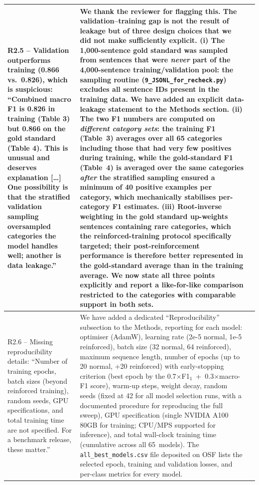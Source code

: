 \documentclass[11pt]{article}
\begin{document}
\begin{landscape}
\begin{longtable}{|L{4cm}|L{12cm}|L{9cm}|}
R2.5 -- Validation outperforms training (0.866 vs.\ 0.826), which is suspicious: \enquote{Combined macro F1 is 0.826 in training (Table 3) but 0.866 on the gold standard (Table 4). This is unusual and deserves explanation [\dots] One possibility is that the stratified validation sampling oversampled categories the model handles well; another is data leakage.} &
We thank the reviewer for flagging this. The validation--training gap is not the result of leakage but of three design choices that we did not make sufficiently explicit. (i) The 1{,}000-sentence gold standard was sampled from sentences that were \emph{never} part of the 4{,}000-sentence training/validation pool: the sampling routine (\texttt{9\_JSONL\_for\_recheck.py}) excludes all sentence IDs present in the training data. We have added an explicit data-leakage statement to the Methods section. (ii) The two F1 numbers are computed on \emph{different category sets}: the training F1 (Table~3) averages over all 65 categories including those that had very few positives during training, while the gold-standard F1 (Table~4) is averaged over the same categories \emph{after} the stratified sampling ensured a minimum of 40 positive examples per category, which mechanically stabilises per-category F1 estimates. (iii) Root-inverse weighting in the gold standard up-weights sentences containing rare categories, which the reinforced-training protocol specifically targeted; their post-reinforcement performance is therefore better represented in the gold-standard average than in the training average. We now state all three points explicitly and report a like-for-like comparison restricted to the categories with comparable support in both sets. &
\\
\hline

R2.6 -- Missing reproducibility details: \enquote{Number of training epochs, batch sizes (beyond reinforced training), random seeds, GPU specifications, and total training time are not specified. For a benchmark release, these matter.} &
We have added a dedicated \enquote{Reproducibility} subsection to the Methods, reporting for each model: optimiser (AdamW), learning rate (2e-5 normal, 1e-5 reinforced), batch size (32 normal, 64 reinforced), maximum sequence length, number of epochs (up to 20 normal, +20 reinforced) with early-stopping criterion (best epoch by the 0.7$\times$F1$_{1}$~+~0.3$\times$macro-F1 score), warm-up steps, weight decay, random seeds (fixed at 42 for all model selection runs, with a documented procedure for reproducing the full sweep), GPU specification (single NVIDIA A100 80GB for training; CPU/MPS supported for inference), and total wall-clock training time (cumulative across all 65~models). The \texttt{all\_best\_models.csv} file deposited on OSF lists the selected epoch, training and validation losses, and per-class metrics for every model. &
\\
\hline

\end{longtable}

\end{landscape}
\end{document}

